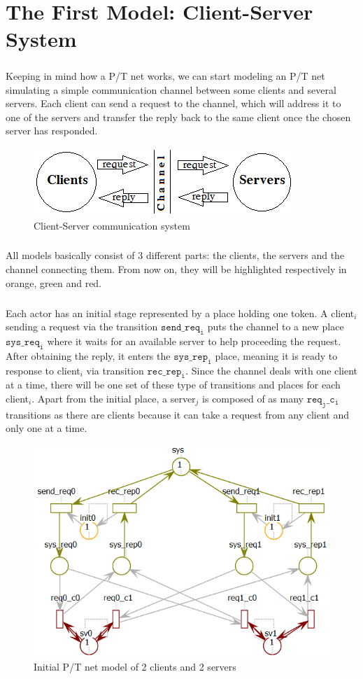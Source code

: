 \documentclass{article}
\begin{document}
	\section{The First Model: Client-Server System}
	\subparagraph{}Keeping in mind how a P/T net works, we can start modeling an P/T net simulating a simple communication channel between some clients and several servers. Each client can send a request to the channel, which will address it to one of the servers and transfer the reply back to the same client once the chosen server has responded.
	\begin{figure}[h]
		\centering
		\includegraphics[scale=0.7]{cssys}
		\caption{Client-Server communication system}
	\end{figure}
	\subparagraph{}All models basically consist of 3 different parts: the clients, the servers and the channel connecting them. From now on, they will be highlighted respectively in orange, green and red. 
	\subparagraph{}Each actor has an initial stage represented by a place holding one token. A client$_i$ sending a request via the transition $\mathtt{send\_req_i}$ puts the channel to a new place $\mathtt{sys\_req_i}$ where it waits for an available server to help proceeding the request. After obtaining the reply, it enters the $\mathtt{sys\_rep_i}$ place, meaning it is ready to response to client$_i$ via transition $\mathtt{rec\_rep_i}$. Since the channel deals with one client at a time, there will be one set of these type of transitions and places for each client$_i$. Apart from the initial place, a server$_j$ is composed of as many $\mathtt{req_j\_c_i}$  transitions as there are clients because it can take a request from any client and only one at a time. 
	\begin{figure}[h]
		\centering
		\includegraphics[scale=0.5]{cli2sv2_abs}
		\caption{Initial P/T net model of 2 clients and 2 servers}
	\end{figure}
\end{document}
